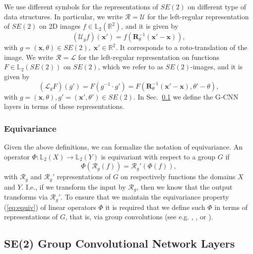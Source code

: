 \documentclass[twocolumn,final]{article}
\begin{document}
We use different symbols for the representations of $SE(2)$ on different type of data structures. In particular, we write $\mathcal{R}=\mathcal{U}$ for the left-regular representation of $SE(2)$ on 2D images $f \in \mathbb{L}_2(\mathbb{R}^2)$, and it is given by
\begin{equation}
\label{eq:leftregreprSE2on2D}
(\mathcal{U}_g f) (\mathbf{x}') = f(\mathbf{R}_\theta^{-1} (\mathbf{x}' - \mathbf{x})),
\end{equation}
with $g = (\mathbf{x},\theta) \in SE(2), \; \mathbf{x}' \in \mathbb{R}^2$. It corresponds to a roto-translation of the image. We write $\mathcal{R}=\mathcal{L}$ for the left-regular representation on functions $F\in \mathbb{L}_2(SE(2))$ on $SE(2)$, which we refer to as $SE(2)$-images, and it is given by
\begin{equation}
\label{eq:leftregreprSE2}
(\mathcal{L}_g  F) (g')= F(g^{-1} \cdot g') = F(\mathbf{R}_\theta^{-1} (\mathbf{x}' - \mathbf{x}), \theta' - \theta),
\end{equation}
with $g=(\mathbf{x},\theta),g'=(\mathbf{x}',\theta') \in SE(2)$.
In Sec.~\ref{gCNNpipeline} we define the G-CNN layers in terms of these representations. 


\subsubsection{Equivariance}
Given the above definitions, we can formalize the notation of equivariance. An operator $\Phi: \mathbb{L}_2(X) \rightarrow \mathbb{L}_2(Y)$ is equivariant with respect to a group $G$ if
\begin{equation}
\label{eq:equiv}
\Phi(\mathcal{R}_g(f)) = \mathcal{R}_g'(\Phi(f)),
\end{equation}
with $\mathcal{R}_g$ and $\mathcal{R}_g'$ representations of $G$ on respectively functions the domains $X$ and $Y$. I.e., if we transform the input by $\mathcal{R}_g$, then we know that the output transforms via $\mathcal{R}_g'$. To ensure that we maintain the equivariance property (\ref{eq:equiv}) of linear operators $\Phi$ it is required that we define such $\Phi$ in terms of representations of $G$, that is, via group convolutions (see e.g. \citep[Thm.~1]{bekkers_b-spline_2019}, \citep[Thm.~21]{duits_perceptual_2005}, or \citep[Thm.~6.1]{cohen_general_2018}).


\subsection{SE(2) Group Convolutional Network Layers}
\label{gCNNpipeline}
\end{document}

